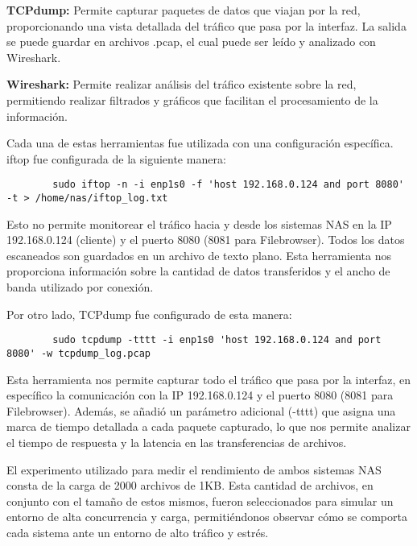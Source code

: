 \documentclass[a4paper,10pt]{article}
\begin{document}
	\textbf{TCPdump:} Permite capturar paquetes de datos que viajan por la red, proporcionando una vista detallada del tráfico que pasa por la interfaz. La salida se puede guardar en archivos .pcap, el cual puede ser leído y analizado con Wireshark.
	
	\textbf{Wireshark:} Permite realizar análisis del tráfico existente sobre la red, permitiendo realizar filtrados y gráficos que facilitan el procesamiento de la información.
	
	Cada una de estas herramientas fue utilizada con una configuración específica. iftop fue configurada de la siguiente manera:
	
	\begin{verbatim}
		sudo iftop -n -i enp1s0 -f 'host 192.168.0.124 and port 8080' -t > /home/nas/iftop_log.txt
	\end{verbatim}
	
	Esto no permite monitorear el tráfico hacia y desde los sistemas NAS en la IP 192.168.0.124 (cliente) y el puerto 8080 (8081 para Filebrowser). Todos los datos escaneados son guardados en un archivo de texto plano. Esta herramienta nos proporciona información sobre la cantidad de datos transferidos y el ancho de banda utilizado por conexión.
	
	Por otro lado, TCPdump fue configurado de esta manera:
	
	\begin{verbatim}
		sudo tcpdump -tttt -i enp1s0 'host 192.168.0.124 and port 8080' -w tcpdump_log.pcap
	\end{verbatim}
	
	Esta herramienta nos permite capturar todo el tráfico que pasa por la interfaz, en específico la comunicación con la IP 192.168.0.124 y el puerto 8080 (8081 para Filebrowser). Además, se añadió un parámetro adicional (-tttt) que asigna una marca de tiempo detallada a cada paquete capturado, lo que nos permite analizar el tiempo de respuesta y la latencia en las transferencias de archivos.
	
	El experimento utilizado para medir el rendimiento de ambos sistemas NAS consta de la carga de 2000 archivos de 1KB. Esta cantidad de archivos, en conjunto con el tamaño de estos mismos, fueron seleccionados para simular un entorno de alta concurrencia y carga, permitiéndonos observar cómo se comporta cada sistema ante un entorno de alto tráfico y estrés.
	
\end{document}
